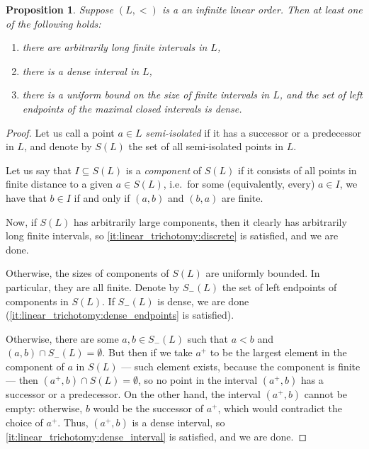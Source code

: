 \documentclass[final,a4paper,12pt]{amsart}
\date{\today}
\newtheorem{prop}[thm]{Proposition}
\theoremstyle{remark}
\theoremstyle{definition}
\begin{document}
	
	\address{
		Instytut Matematyczny, Uniwersytet Wrocławski,
		pl. Grunwaldzki 2/4, 50-384 Wrocław, Poland
	}
	
	
	
	\author{Tomasz Rzepecki}
	
	\begin{prop}
		\label{prop:linear_trichotomy}
		Suppose $(L,<)$ is a an infinite linear order. Then at least one of the following holds:
		\begin{enumerate}
			\item
			\label{it:linear_trichotomy:discrete}
			there are arbitrarily long finite intervals in $L$,
			\item
			\label{it:linear_trichotomy:dense_interval}
			there is a dense interval in $L$,
			\item
			\label{it:linear_trichotomy:dense_endpoints}
			there is a uniform bound on the size of finite intervals in $L$, and the set of left endpoints of the maximal closed intervals is dense.
		\end{enumerate}
	\end{prop}
	\begin{proof}
		Let us call a point $a\in L$ \emph{semi-isolated} if it has a successor or a predecessor in $L$, and denote by $S(L)$ the set of all semi-isolated points in $L$.
		
		Let us say that $I\subseteq S(L)$ is a \emph{component} of $S(L)$ if it consists of all points in finite distance to a given $a\in S(L)$, i.e.\ for some (equivalently, every) $a\in I$, we have that $b\in I$ if and only if $(a,b)$ and $(b,a)$ are finite.
		
		Now, if $S(L)$ has arbitrarily large components, then it clearly has arbitrarily long finite intervals, so \ref{it:linear_trichotomy:discrete} is satisfied, and we are done.
		
		Otherwise, the sizes of components of $S(L)$ are uniformly bounded. In particular, they are all finite. Denote by $S_-(L)$ the set of left endpoints of components in $S(L)$. If $S_-(L)$ is dense, we are done (\ref{it:linear_trichotomy:dense_endpoints} is satisfied). 
		
		Otherwise, there are some $a,b\in S_-(L)$ such that $a<b$ and $(a,b)\cap S_-(L)=\emptyset$. But then if we take $a^+$ to be the largest element in the component of $a$ in $S(L)$ --- such element exists, because the component is finite --- then $(a^+,b)\cap S(L)=\emptyset$, so no point in the interval $(a^+,b)$ has a successor or a predecessor. On the other hand, the interval $(a^+,b)$ cannot be empty: otherwise, $b$ would be the successor of $a^+$, which would contradict the choice of $a^+$. Thus, $(a^+,b)$ is a dense interval, so \ref{it:linear_trichotomy:dense_interval} is satisfied, and we are done.
	\end{proof}
	
\end{document}
